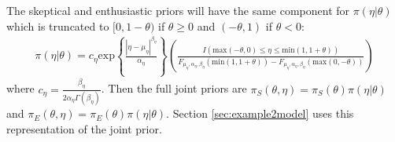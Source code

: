 \documentclass[12pt]{article}
\begin{document}
The skeptical and enthusiastic priors will have the same component for $\pi(\eta|\theta)$ which is truncated to $[0,1-\theta)$ if $\theta\geq 0$ and $(-\theta,1)$ if $\theta < 0$: 
\begin{align*}
\pi(\eta|\theta)=c_\eta\text{exp}\left\{\frac{|\eta-\mu_\eta|^{\beta_\eta}}{\alpha_\eta}\right\}\left(\frac{I(\text{max}(-\theta,0)\leq\eta\leq \text{min}(1,1+\theta))}{F_{\mu_\eta,\alpha_\eta,\beta_\eta}(\text{min}(1,1+\theta))-F_{\mu_\eta,\alpha_\eta,\beta_\eta}(\text{max}(0,-\theta))}\right)
\end{align*}
where $c_\eta=\frac{\beta_\eta}{2\alpha_\eta\Gamma(\beta_\eta)}$. Then the full joint priors are $\pi_S(\theta,\eta)=\pi_S(\theta)\pi(\eta|\theta)$ and $\pi_E(\theta,\eta)=\pi_E(\theta)\pi(\eta|\theta)$.
Section \ref{sec:example2model} uses this representation of the joint prior.
%
%
\end{document}
